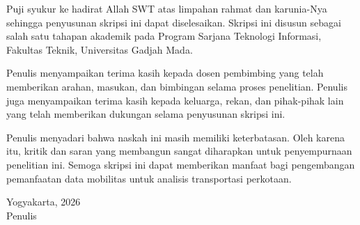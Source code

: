 Puji syukur ke hadirat Allah SWT atas limpahan rahmat dan karunia-Nya sehingga penyusunan skripsi ini dapat diselesaikan. Skripsi ini disusun sebagai salah satu tahapan akademik pada Program Sarjana Teknologi Informasi, Fakultas Teknik, Universitas Gadjah Mada.

Penulis menyampaikan terima kasih kepada dosen pembimbing yang telah memberikan arahan, masukan, dan bimbingan selama proses penelitian. Penulis juga menyampaikan terima kasih kepada keluarga, rekan, dan pihak-pihak lain yang telah memberikan dukungan selama penyusunan skripsi ini.

Penulis menyadari bahwa naskah ini masih memiliki keterbatasan. Oleh karena itu, kritik dan saran yang membangun sangat diharapkan untuk penyempurnaan penelitian ini. Semoga skripsi ini dapat memberikan manfaat bagi pengembangan pemanfaatan data mobilitas untuk analisis transportasi perkotaan.

\begin{flushright}
Yogyakarta, 2026\\
Penulis
\end{flushright}
